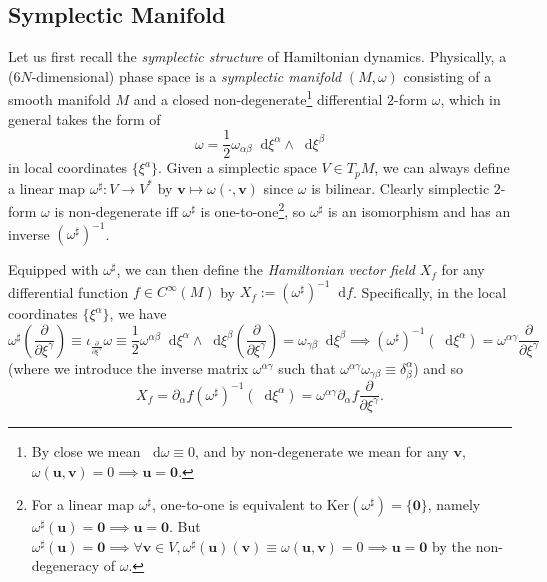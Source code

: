\documentclass[10pt,nofootinbib,letterpaper]{revtex4}
\newcommand*\dd{\mathop{}\!\mathrm{d}}
\begin{document}
	\subsection{Symplectic Manifold}
		Let us first recall the \emph{symplectic structure} of Hamiltonian dynamics. Physically, a ($6N$-dimensional) phase space is a \emph{symplectic manifold} $(M,\omega)$ consisting of a smooth manifold $M$ and a closed non-degenerate\footnote{By close we mean $\dd\omega\equiv0$, and by non-degenerate we mean for any $\bm{v}$, $\omega(\bm{u},\bm{v})=0\implies \bm{u}=\bm{0}$.} differential $2$-form $\omega$, which in general takes the form of
		\begin{equation*}
			\omega=\dfrac{1}{2}\omega_{\alpha \beta}\dd\xi^\alpha\wedge\dd\xi^\beta
		\end{equation*}
		in local coordinates $\{\xi^a\}$. Given a simplectic space $V\in T_pM$, we can always define a linear map $\omega^\sharp:V\rightarrow V^*$ by $\bm{v}\mapsto\omega(\cdot,\bm{v})$ since $\omega$ is bilinear. Clearly simplectic $2$-form $\omega$ is non-degenerate iff $\omega^\sharp$ is one-to-one\footnote{For a linear map $\omega^\sharp$, one-to-one is equivalent to $\mathrm{Ker}(\omega^\sharp)=\{\bm{0}\}$, namely $\omega^\sharp(\bm{u})=\bm{0}\implies\bm{u}=\bm{0}$. But $\omega^\sharp(\bm{u})=\bm{0}\implies \forall \bm{v}\in V, \omega^\sharp(\bm{u})(\bm{v})\equiv\omega(\bm{u},\bm{v})=0\implies\bm{u}=\bm{0}$ by the non-degeneracy of $\omega$.}, so $\omega^\sharp$ is an isomorphism and has an inverse $(\omega^\sharp)^{-1}$.\par
		Equipped with $\omega^\sharp$, we can then define the \emph{Hamiltonian vector field} $X_f$ for any differential function $f\in C^\infty(M)$ by $X_f:=(\omega^\sharp)^{-1}\dd f$. Specifically, in the local coordinates $\{\xi^\alpha\}$, we have
		\begin{equation*}
			\omega^\sharp\left(\dfrac{\partial }{\partial \xi^\gamma}\right)\equiv\iota_{\frac{\partial }{\partial \xi^\gamma}}\omega\equiv\dfrac{1}{2}\omega^{\alpha\beta}\dd\xi^\alpha\wedge\dd\xi^\beta\left(\dfrac{\partial }{\partial \xi^\gamma}\right)=\omega_{\gamma\beta}\dd\xi^\beta\implies (\omega^\sharp)^{-1}(\dd\xi^\alpha)=\omega^{\alpha\gamma}\dfrac{\partial }{\partial \xi^\gamma}
		\end{equation*}
		(where we introduce the inverse matrix $\omega^{\alpha\gamma}$ such that $\omega^{\alpha\gamma}\omega_{\gamma\beta}\equiv\delta^\alpha_\beta$) and so
		\begin{equation*}
			X_f=\partial_\alpha f(\omega^\sharp)^{-1}(\dd\xi^\alpha)=\omega^{\alpha\gamma}\partial_\alpha f\dfrac{\partial }{\partial \xi^\gamma}.
		\end{equation*}
\end{document}
